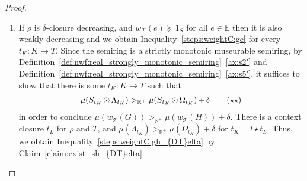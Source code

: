 \begin{proof}
\begin{enumerate}
        \item
            If $\rho$ is $\delta$-closure decreasing, and $w_\mathcal{T}(e) \mathop{\succeq} 1_S$ for all $e \mathop{\in} \mathbb{E}$ then it is also weakly decreasing and we obtain Inequality~\eqref{steps:weightC:ge} for every $t_K : K \mathop{\to} T$.
            Since the semiring is a strictly monotonic museurable semiring,  by Definition~\ref{def:nwf:real_strongly_monotonic_semiring}~\eqref{ax:s2'} and Definition~\ref{def:nwf:real_strongly_monotonic_semiring}~\eqref{ax:s5'}, it suffices to show that there is some $t_K : K \mathop{\to} T$ such that 
            \begin{align}
                \mu(S_{t_K} \mathop{\odot} \Lambda_{t_K}) >_{\mathbb{R}^+} \mu(S_{t_K} \mathop{\odot} \Omega_{t_K})\mathop{+}
                \delta
              \tag{$\star\star$}\label{steps:weightC:gh_{DT}elta}
            \end{align}
            in order to conclude $ \mu(w_\mathcal{T}(G)) >_{\mathbb{R}^+} \mu(w_\mathcal{T}(H))\mathop{+}\delta$.
            There is a context closure $t_L$ for $\rho$ and $T$, and
            $\mu(\Lambda_{t_K}) >_{\mathbb{R}^+} \mu(\Omega_{t_K})\mathop{+}\delta$
            for $t_K \mathop{=} l \mathop{\star} t_L$. Thus, we obtain Inequality~\eqref{steps:weightC:gh_{DT}elta} by Claim~\ref{claim:exist_sh_{DT}elta}.
    \end{enumerate}
\end{proof}  